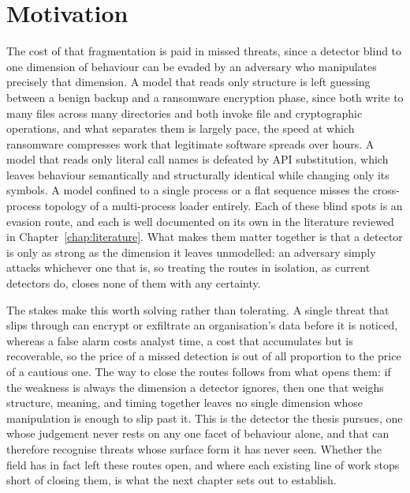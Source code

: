 \documentclass[%
    BCOR=10mm,
    DIV=13,
    toc=bibliography,
    toc=listof,
    oneside,
    12pt,
]{scrbook}
\begin{document}
\section{Motivation}
\label{sec:motivation}

The cost of that fragmentation is paid in missed threats, since a detector blind
to one dimension of behaviour can be evaded by an adversary who manipulates
precisely that dimension. A model that reads only structure is left
guessing between a benign backup and a ransomware encryption phase, since both
write to many files across many directories and both invoke file and cryptographic
operations, and what separates them is largely pace, the speed at which ransomware
compresses work that legitimate software spreads over hours. A model that reads only literal call names
is defeated by API substitution, which leaves
behaviour semantically and structurally identical while changing only its symbols.
A model confined to a single process or a flat sequence misses the cross-process
topology of a multi-process loader entirely. Each of these blind spots is an
evasion route, and each is well documented on its own in the literature reviewed in
Chapter~\ref{chap:literature}. What makes them matter together is that a detector is
only as strong as the dimension it leaves unmodelled: an adversary simply attacks
whichever one that is, so treating the routes in isolation, as current detectors do,
closes none of them with any certainty.

The stakes make this worth solving rather than tolerating. A single threat that slips
through can encrypt or exfiltrate an organisation's data before it is noticed,
whereas a false alarm costs analyst time, a cost that accumulates but is
recoverable, so the
price of a missed detection is out of all proportion to the price of a cautious one.
The way to close the routes follows from what opens them: if the weakness is always
the dimension a detector ignores, then one that weighs structure, meaning, and timing
together leaves no single dimension whose manipulation is enough to slip past it.
This is the detector the thesis pursues, one whose judgement never rests on any one
facet of behaviour alone, and that can therefore recognise threats whose surface form
it has never seen. Whether the field has in fact left these routes open, and where
each existing line of work stops short of closing them, is what the next chapter sets
out to establish.

\end{document}
